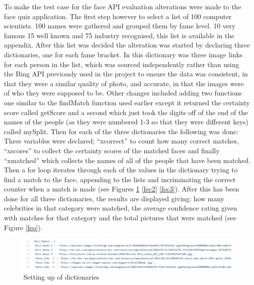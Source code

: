 \documentclass[12pt,a4paper]{article}
\begin{document}
To make the test case for the face API evaluation alterations were made to the face quiz application. The first step however to select a list of 100 computer scientists. 100 names were gathered and grouped them by fame level. 10 very famous 15 well known and 75 industry recognised, this list is available in the appendix. After this list was decided the alteration was started by declaring three dictionaries, one for each fame bracket. In this dictionary was three image links for each person in the list, which was sourced independently rather than using the Bing API previously used in the project to ensure the data was consistent, in that they were a similar quality of photo, and accurate, in that the images were of who they were supposed to be. Other changes included adding two functions one similar to the findMatch function used earlier except it returned the certainty score called getScore and a second which just took the digits off of the end of the names of the people (as they were numbered 1-3 so that they were different keys) called mySplit. Then for each of the three dictionaries the following was done: Three variables were declared; “xcorrect” to count how many correct matches, “xscores” to collect the certainty scores of the matched faces and finally “xmatched” which collects the names of all of the people that have been matched. Then a for loop iterates through each of the values in the dictionary trying to find a match to the face, appending to the lists and incriminating the correct counter when a match is made  (see Figures \ref{fec1} \ref{fec2} \ref{fec3}).  After this has been done for all three dictionaries, the results are displayed giving: how many celebrities in that category were matched, the average confidence rating given with matches for that category and the total pictures that were matched (see Figure \ref{feo}).    

\begin{figure}[!ht]
    \centering
    \includegraphics[width=1.0\textwidth]{Figs/faceevalcode1.PNG} 
    \caption{Setting up of dictionaries} 
    \label{fec1}
\end{figure} 
\end{document}
